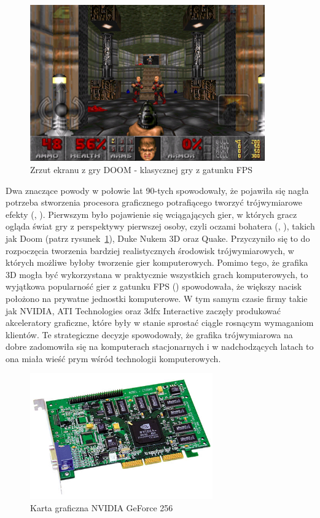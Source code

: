 \begin{figure}[ht]
\centering\includegraphics[width=0.9\textwidth]{figures/03/doom.png}
\caption{Zrzut ekranu z gry DOOM - klasycznej gry z gatunku FPS}\label{rys:doom}
\end{figure}

Dwa znaczące powody w połowie lat 90-tych spowodowały, że pojawiła się nagła potrzeba stworzenia procesora graficznego potrafiącego tworzyć trójwymiarowe efekty (, ). Pierwszym było pojawienie się wciągających gier, w których gracz ogląda świat gry z perspektywy pierwszej osoby, czyli oczami bohatera (, ), takich jak Doom (patrz rysunek~\ref{rys:doom}), Duke Nukem 3D oraz Quake. Przyczyniło się to do rozpoczęcia tworzenia bardziej realistycznych środowisk trójwymiarowych, w których możliwe byłoby tworzenie gier komputerowych. Pomimo tego, że grafika 3D mogła być wykorzystana w praktycznie wszystkich grach komputerowych, to wyjątkowa popularność gier z gatunku FPS () spowodowała, że większy nacisk położono na prywatne jednostki komputerowe. W tym samym czasie firmy takie jak NVIDIA, ATI Technologies oraz 3dfx Interactive zaczęły produkować akceleratory graficzne, które były w stanie sprostać ciągle rosnącym wymaganiom klientów. Te strategiczne decyzje spowodowały, że grafika trójwymiarowa na dobre zadomowiła się na komputerach stacjonarnych i w nadchodzących latach to ona miała wieść prym wśród technologii komputerowych.

\begin{figure}[ht]
\centering\includegraphics[width=0.7\textwidth]{figures/03/geforce-256.jpg}
\caption{Karta graficzna NVIDIA GeForce 256}\label{rys:gf256}
\end{figure}

